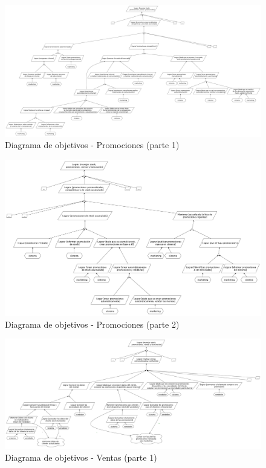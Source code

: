 \begin{figure}[h!]
  \centering
  \includegraphics[width=1.5\textwidth, angle=90]{./imagenes/promociones_1.pdf}
  \caption{Diagrama de objetivos - Promociones (parte 1)}
  \label{fig:diagProm1}
\end{figure}

\clearpage


\begin{figure}[h!]
  \centering
  \includegraphics[width=1.3\textwidth, angle=90]{./imagenes/promociones_2.pdf}
  \caption{Diagrama de objetivos - Promociones (parte 2)}
  \label{fig:diagProm2}
\end{figure}

\clearpage

\begin{figure}[h!]
  \centering
  \includegraphics[width=1.5\textwidth, angle=90]{./imagenes/ventas_1.pdf}
  \caption{Diagrama de objetivos - Ventas (parte 1)}
\end{figure}



